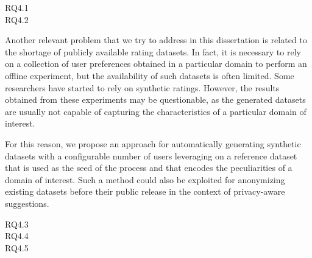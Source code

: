 \begin{description}
\item[RQ4.1] 
\item[RQ4.2] 
\end{description}

Another relevant problem that we try to address in this dissertation is related to the shortage of publicly available rating datasets. In fact, it is necessary to rely on a collection of user preferences obtained in a particular domain to perform an offline experiment, but the availability of such datasets is often limited. Some researchers have started to rely on synthetic ratings. However, the results obtained from these experiments may be questionable, as the generated datasets are usually not capable of capturing the characteristics of a particular domain of interest.

For this reason, we propose an approach for automatically generating synthetic datasets with a configurable number of users leveraging on a reference dataset that is used as the seed of the process and that encodes the peculiarities of a domain of interest. Such a method could also be exploited for anonymizing existing datasets before their public release in the context of privacy-aware suggestions. 

\begin{description}
\item[RQ4.3] 
\item[RQ4.4] 
\item[RQ4.5] 
\end{description}

